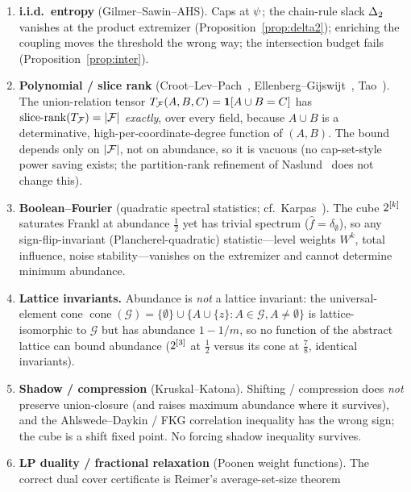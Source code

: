 \documentclass[11pt]{amsart}
\theoremstyle{definition}
\theoremstyle{remark}
\begin{document}
\begin{enumerate}[label=\textbf{M\arabic*.},leftmargin=2.6em,itemsep=3pt]
\item \textbf{i.i.d.\ entropy} (Gilmer--Sawin--AHS). Caps at $\psi$; the
chain-rule slack $\Delta_2$ vanishes at the product extremizer
(Proposition~\ref{prop:delta2}); enriching the coupling moves the threshold the
wrong way; the intersection budget fails (Proposition~\ref{prop:inter}).
\item \textbf{Polynomial / slice rank} (Croot--Lev--Pach~\cite{clp2017},
Ellenberg--Gijswijt~\cite{ellenberggijswijt2017},
Tao~\cite{tao2016sliceblog}). The union-relation tensor
$T_{\mathcal{F}}(A,B,C)=\mathbf 1[A\cup B=C]$ has $\operatorname{slice-rank}(T_{\mathcal{F}})=|\mathcal{F}|$
\emph{exactly}, over every field, because $A\cup B$ is a determinative,
high-per-coordinate-degree function of $(A,B)$. The bound depends only on $|\mathcal{F}|$,
not on abundance, so it is vacuous (no cap-set-style power saving exists; the
partition-rank refinement of Naslund~\cite{naslund2020} does not change this).
\item \textbf{Boolean--Fourier} (quadratic spectral statistics;
cf.\ Karpas~\cite{karpas2017}). The cube $2^{[k]}$ saturates Frankl at abundance
$\tfrac12$ yet has trivial spectrum ($\hat f=\delta_\emptyset$), so any
sign-flip-invariant (Plancherel-quadratic) statistic---level weights $W^k$, total
influence, noise stability---vanishes on the extremizer and cannot determine
minimum abundance.
\item \textbf{Lattice invariants.} Abundance is \emph{not} a lattice invariant:
the universal-element cone $\operatorname{cone}(\mathcal G)=
\{\emptyset\}\cup\{A\cup\{z\}:A\in\mathcal G,A\neq\emptyset\}$ is
lattice-isomorphic to $\mathcal G$ but has abundance $1-1/m$, so no function of the
abstract lattice can bound abundance ($2^{[3]}$ at $\tfrac12$ versus its cone at
$\tfrac78$, identical invariants).
\item \textbf{Shadow / compression} (Kruskal--Katona). Shifting / compression does
\emph{not} preserve union-closure (and raises maximum abundance where it survives),
and the Ahlswede--Daykin / FKG correlation inequality has the wrong sign; the cube
is a shift fixed point. No forcing shadow inequality survives.
\item \textbf{LP duality / fractional relaxation} (Poonen weight functions). The
correct dual cover certificate is Reimer's average-set-size theorem~\cite{reimer2003}

\end{enumerate}
\end{document}

